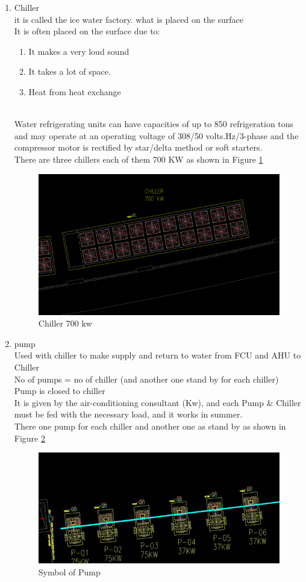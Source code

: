 \documentclass[12pt,fleqn]{book} %
\begin{document}
\begin{enumerate}
    \item Chiller
    \\  it is called the ice water factory. what is placed on the surface
    \\ It is often placed on the surface due to:
    \begin{enumerate}
        \item It makes a very loud sound
        \item It takes a lot of space.
        \item Heat from heat exchange
    \end{enumerate}
\\ Water refrigerating units can have capacities of up to 850 refrigeration tons and may operate at an operating voltage of 308/50 volts.Hz/3-phase and the compressor motor is rectified by star/delta method or soft starters.
\\There are three chillers each of them 700 KW as shown in  Figure \ref{fig:h 3}
\begin{figure}[h!]
    \centering
    \includegraphics[width=0.6\linewidth]{h 3.png}
    \caption{ Chiller 700 kw }
    \label{fig:h 3}
\end{figure} 
 

    \item pump 
    \\ Used with chiller to make supply and return to water from FCU and AHU to Chiller
 \\No of pumps = no of chiller (and another one stand by for each chiller)
 \\  Pump is closed to chiller 
 \\ It is given by the air-conditioning consultant (Kw), and each Pump & Chiller must be fed with the necessary load, and it works in summer.
 \\There one  pump for each chiller and another one as stand by  as shown in  Figure \ref{fig:h 4}
 \begin{figure}[h!]
    \centering
    \includegraphics[width=0.6\linewidth]{h 4.png}
    \caption{ Symbol of Pump }
    \label{fig:h 4}
\end{figure} 
 


\end{enumerate}
\end{document}
